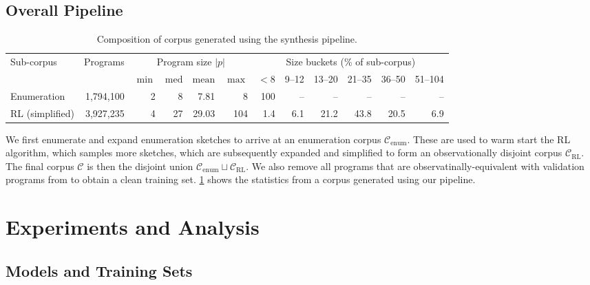 \documentclass[12pt]{article}
\begin{document}
\subsection{Overall Pipeline}
\label{sec:overall-pipeline}

\begin{table}[t]
\centering
\caption{Composition of corpus generated using the synthesis pipeline.}
\label{tab:corpus-a}
\footnotesize
\begin{tabular}{lrrrrr@{\quad}rrrrrr}
\toprule
\multirow{2}{*}{Sub-corpus} & \multirow{2}{*}{Programs} & \multicolumn{4}{c}{Program size $|p|$} & \multicolumn{6}{c}{Size buckets (\% of sub-corpus)} \\
\cmidrule(lr){3-6}\cmidrule(lr){7-12}
    & & $\min$ & $\mathrm{med}$ & $\mathrm{mean}$ & $\max$ & $<$8 & 9--12 & 13--20 & 21--35 & 36--50 & 51--104 \\
\midrule
Enumeration     & 1{,}794{,}100 & 2 & 8  & 7.81  & 8   &  100  & --  & --   & --   & --   & --   \\
RL (simplified) & 3{,}927{,}235 & 4 & 27 & 29.03 & 104 & 1.4 & 6.1 & 21.2 & 43.8 & 20.5 & 6.9  \\
\bottomrule
\end{tabular}
\end{table}

We first enumerate and expand enumeration sketches to arrive at an enumeration corpus $\mathcal{C}_{\mathrm{enum}}$. These are used to warm start the RL algorithm, which samples more sketches, which are subsequently expanded and simplified to form an observationally disjoint corpus $\mathcal{C}_{\mathrm{RL}}$. The final corpus $\mathcal{C}$ is then the disjoint union $\mathcal{C}_{\mathrm{enum}} \sqcup \mathcal{C}_{\mathrm{RL}}$. We also remove all programs that are observatinally-equivalent with validation programs from \citet{rule2024symbolic} to obtain a clean training set. \cref{tab:corpus-a} shows the statistics from a corpus generated using our pipeline.

\section{Experiments and Analysis}
\label{sec:experiments-and-analysis}

\subsection{Models and Training Sets}
\label{sec:models-and-training}
\end{document}
